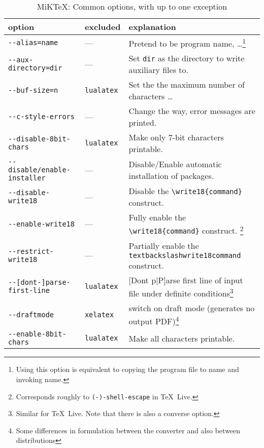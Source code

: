 \documentclass{article}
\newcommand{\lualatex}{\texttt{lualatex}}
\newcommand{\xelatex}{\texttt{xelatex}}
\newcommand{\texlive}{\TeX~Live}
\newcommand{\miktex}{MiKTeX}
\begin{document}
{\footnotesize
\begin{longtable}{|lll|}
  \toprule
  option & excluded & explanation \\
  \midrule
  \midrule
  \endfirsthead%
  \bottomrule
  \caption{\label{tab:latexOptionsCommonMiktex} \miktex: Common options, with up to one exception }
  \endlastfoot%
  \texttt{-{}-alias=name}            & ---         & Pretend to be program name, \dots\footnote%
{Using this option is equivalent to copying the program file to name and invoking name.} \\
\texttt{-{}-aux-directory=dir}       & ---         & 
Set \texttt{dir} as the directory to write auxiliary files to. \\
\texttt{-{}-buf-size=n}              & \lualatex{} & Set the the maximum number of characters \dots \\
\texttt{-{}-c-style-errors}          & ---         & Change the way, error messages are printed. \\
\texttt{-{}-disable-8bit-chars}      & \lualatex{} & Make only 7-bit characters printable. \\
\texttt{-{}-disable/enable-installer} & ---         & Disable/Enable automatic installation of packages. \\
\texttt{-{}-disable-write18}         & ---         & Disable the \texttt{\textbackslash{}write18\{command\}} construct.\\
\texttt{-{}-enable-write18}          & ---         & Fully enable the \texttt{\textbackslash{}write18\{command\}} construct. \footnote%
{Corresponds roughly to \texttt{(-)-shell-escape} in \texlive. } \\
\texttt{-{}-restrict-write18}        & ---         & Partially enable the \texttt{textbackslash{}write18{command}} construct. \\
\texttt{-{}-[dont-]parse-first-line}        & \lualatex{} & [Dont p|P]arse first line of input file under definite conditions\footnote%
{Similar for \texlive. Note that there is also a converse option. } \\
\texttt{-{}-draftmode}               & \xelatex{}  & switch on draft mode (generates no output PDF)\footnote%
{Some differences in formulation between the converter and also between distributions} \\
\texttt{-{}-enable-8bit-chars}       & \lualatex{} & Make all characters printable. \\

\end{longtable}}
\end{document}
